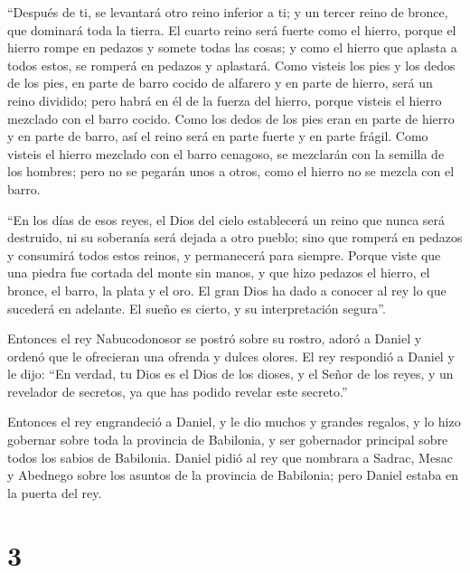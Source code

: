  ``Después de ti, se levantará otro reino inferior a ti;
y un tercer reino de bronce, que dominará toda la tierra.
 El cuarto reino será fuerte como el hierro, porque el
hierro rompe en pedazos y somete todas las cosas; y como el hierro que
aplasta a todos estos, se romperá en pedazos y aplastará.
 Como visteis los pies y los dedos de los pies, en parte
de barro cocido de alfarero y en parte de hierro, será un reino
dividido; pero habrá en él de la fuerza del hierro, porque visteis el
hierro mezclado con el barro cocido.  Como los dedos de
los pies eran en parte de hierro y en parte de barro, así el reino será
en parte fuerte y en parte frágil.  Como visteis el
hierro mezclado con el barro cenagoso, se mezclarán con la semilla de
los hombres; pero no se pegarán unos a otros, como el hierro no se
mezcla con el barro.

 ``En los días de esos reyes, el Dios del cielo
establecerá un reino que nunca será destruido, ni su soberanía será
dejada a otro pueblo; sino que romperá en pedazos y consumirá todos
estos reinos, y permanecerá para siempre.  Porque viste
que una piedra fue cortada del monte sin manos, y que hizo pedazos el
hierro, el bronce, el barro, la plata y el oro. El gran Dios ha dado a
conocer al rey lo que sucederá en adelante. El sueño es cierto, y su
interpretación segura''.

 Entonces el rey Nabucodonosor se postró sobre su rostro,
adoró a Daniel y ordenó que le ofrecieran una ofrenda y dulces olores.
 El rey respondió a Daniel y le dijo: ``En verdad, tu
Dios es el Dios de los dioses, y el Señor de los reyes, y un revelador
de secretos, ya que has podido revelar este secreto.''

 Entonces el rey engrandeció a Daniel, y le dio muchos y
grandes regalos, y lo hizo gobernar sobre toda la provincia de
Babilonia, y ser gobernador principal sobre todos los sabios de
Babilonia.  Daniel pidió al rey que nombrara a Sadrac,
Mesac y Abednego sobre los asuntos de la provincia de Babilonia; pero
Daniel estaba en la puerta del rey.

\hypertarget{section-2}{%
\section{3}\label{section-2}}

